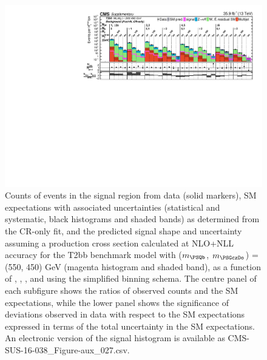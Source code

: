 \clearpage
\begin{figure}[p]
    \begin{center}
        \includegraphics[width=1.00\textwidth]{Supplementary/CMS-SUS-16-038_Figure-aux_027.pdf}
  \caption{Counts of events in the signal region from data (solid markers), SM expectations
    with associated uncertainties (statistical and systematic, black
    histograms and shaded bands) as determined from the CR-only fit,
    and the predicted signal shape and uncertainty assuming a production cross
    section calculated at NLO+NLL accuracy for the
        T2bb benchmark model with ($m_{\PSQb}$, $m_{\PSGczDo}$) = (550, 450) GeV
    (magenta histogram and shaded band),
    as a function of \njet, \nb, \scalht, and \mht using the simplified binning schema.
    The centre panel of each subfigure shows the ratios of
    observed counts and the SM expectations, while the lower panel
    shows the significance of deviations observed in data with respect
    to the SM expectations expressed in terms of the total uncertainty
    in the SM expectations.  
	An electronic version of the signal histogram is available as CMS-SUS-16-038\_Figure-aux\_027.csv.
        }
        \label{fig:T2bb_550_450_MR_sig}
    \end{center}
\end{figure}

